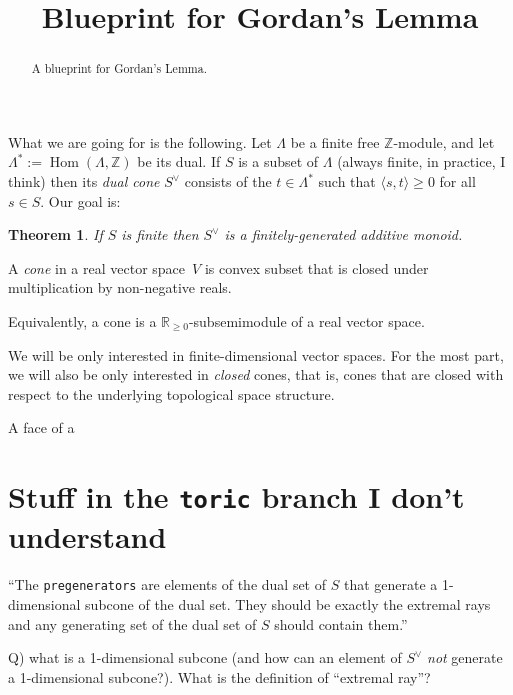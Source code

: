 \documentclass[english]{amsart}
\newcommand{\Z}{\mathbb{Z}}
\newcommand{\nnreal}{\mathbb{R}_{\geq 0}}
\DeclareMathOperator{\Hom}{Hom}
\newtheorem{theorem}{Theorem}
\begin{document}
\title[]{Blueprint for Gordan's Lemma}

\begin{abstract}
A blueprint for Gordan's Lemma.
\end{abstract}

\maketitle

What we are going for is the following. Let $\Lambda$ be a finite free $\Z$-module, and let $\Lambda^*:=\Hom(\Lambda,\Z)$ be its dual. If $S$ is a subset of $\Lambda$ (always finite, in practice, I think) then its \emph{dual cone} $S^\vee$ consists of the $t\in\Lambda^*$ such that $\langle s,t\rangle\geq0$ for all $s\in S$. Our goal is:

\begin{theorem}If $S$ is finite then $S^\vee$ is a finitely-generated additive monoid.
\end{theorem}

\begin{definition}
A \emph{cone} in a real vector space~$V$ is convex subset that is closed under multiplication by
non-negative reals.
\end{definition}

Equivalently, a cone is a $\nnreal$-subsemimodule of a real vector space.

We will be only interested in finite-dimensional vector spaces. For the most part, we will also be
only interested in \emph{closed} cones, that is, cones that are closed with respect to the
underlying topological space structure.





  \begin{definition}
A face of a
\end{definition}



\section{Stuff in the {\tt toric} branch I don't understand}

``The {\tt pregenerators} are elements of the dual set of $S$ that generate a 1-dimensional subcone of the dual set.  They should be exactly the extremal rays and any generating set of the dual set of $S$ should contain them.''

Q) what is a 1-dimensional subcone (and how can an element of $S^\vee$ \emph{not} generate a 1-dimensional subcone?). What is the definition of ``extremal ray''?
\end{document}
